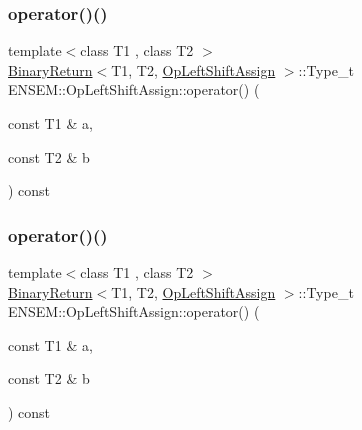 \subsubsection{\texorpdfstring{operator()()}{operator()()}\hspace{0.1cm}{\footnotesize\ttfamily [1/3]}}
{\footnotesize\ttfamily template$<$class T1 , class T2 $>$ \\
\mbox{\hyperlink{structENSEM_1_1BinaryReturn}{Binary\+Return}}$<$T1, T2, \mbox{\hyperlink{structENSEM_1_1OpLeftShiftAssign}{Op\+Left\+Shift\+Assign}} $>$\+::Type\+\_\+t E\+N\+S\+E\+M\+::\+Op\+Left\+Shift\+Assign\+::operator() (\begin{DoxyParamCaption}\item[{const T1 \&}]{a,  }\item[{const T2 \&}]{b }\end{DoxyParamCaption}) const\hspace{0.3cm}{\ttfamily [inline]}}

\mbox{\label{structENSEM_1_1OpLeftShiftAssign_a777be5cb8e7641c4a6b448b0ccf1b745}} 
\subsubsection{\texorpdfstring{operator()()}{operator()()}\hspace{0.1cm}{\footnotesize\ttfamily [2/3]}}
{\footnotesize\ttfamily template$<$class T1 , class T2 $>$ \\
\mbox{\hyperlink{structENSEM_1_1BinaryReturn}{Binary\+Return}}$<$T1, T2, \mbox{\hyperlink{structENSEM_1_1OpLeftShiftAssign}{Op\+Left\+Shift\+Assign}} $>$\+::Type\+\_\+t E\+N\+S\+E\+M\+::\+Op\+Left\+Shift\+Assign\+::operator() (\begin{DoxyParamCaption}\item[{const T1 \&}]{a,  }\item[{const T2 \&}]{b }\end{DoxyParamCaption}) const\hspace{0.3cm}{\ttfamily [inline]}}

\mbox{\label{structENSEM_1_1OpLeftShiftAssign_a777be5cb8e7641c4a6b448b0ccf1b745}} 
